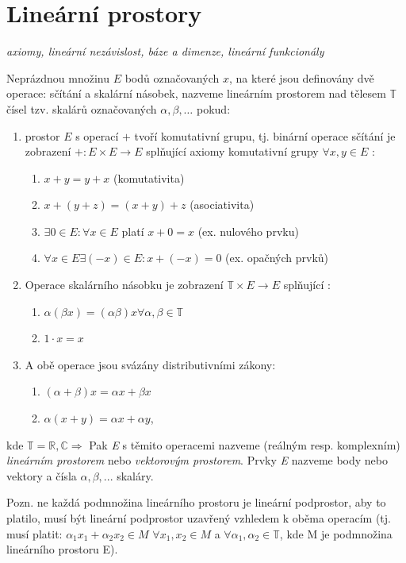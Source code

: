 \section{Lineární prostory}
\textit{axiomy, lineární nezávislost, báze a dimenze, lineární funkcionály}
\\
\begin{definition}
Neprázdnou množinu $E$ bodů označovaných $x$, na které jsou definovány dvě operace: sčítání a skalární násobek, nazveme lineárním prostorem nad tělesem $\mathbb{T}$ čísel tzv. skalárů označovaných $\alpha, \beta,\ldots$
pokud:
\begin{enumerate}
\item prostor $E$ s operací $+$ tvoří komutativní grupu, tj. binární operace sčítání je zobrazení $+:E \times E\rightarrow E $ splňující axiomy komutativní grupy  $\forall x,y \in E$ : \begin{enumerate}
\item  $x+y = y+x$ (komutativita)
\item $x+(y+z)=(x+y)+z$ (asociativita)
\item $\exists 0 \in E: \forall x \in E$ platí $x+0=x$ (ex. nulového prvku)
\item $\forall x \in E \exists (-x)\in E: x+(-x)=0$ (ex. opačných prvků)
\end{enumerate}
\item Operace skalárního násobku je zobrazení $\mathbb{T}\times E\rightarrow E$ splňující :\begin{enumerate}
\item $\alpha (\beta x) = (\alpha \beta) x \forall  \alpha, \beta \in \mathbb{T}$
\item $1 \cdot x = x$
\end{enumerate}
\item A obě operace jsou svázány distributivními zákony: \begin{enumerate}
\item $(\alpha+\beta) x = \alpha x + \beta x$
\item $\alpha (x+y) = \alpha x + \alpha y$,
\end{enumerate}
\end{enumerate}
kde $\mathbb{T}=\mathbb{R,C}\Rightarrow$ Pak \textit{E} s těmito operacemi nazveme (reálným resp. komplexním) \textit{lineárním prostorem} nebo \textit{vektorovým prostorem}. Prvky \textit{E} nazveme body nebo vektory a čísla $\alpha, \beta, ...$ skaláry. 
\end{definition}

Pozn. ne každá podmnožina lineárního prostoru je lineární podprostor, aby to platilo, musí být lineární podprostor uzavřený vzhledem k oběma operacím (tj. musí platit: $\alpha_1 x_1 + \alpha_2 x_2 \in M$ $\forall x_1,x_2 \in M$ a $\forall \alpha_1,\alpha_2 \in \mathbb{T}$, kde M je podmnožina lineárního prostoru E).

